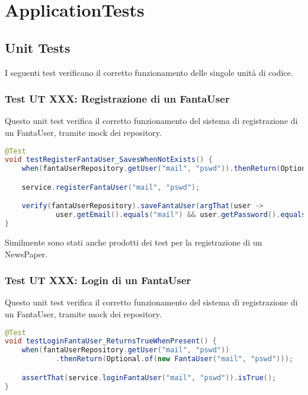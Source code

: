 \section{ApplicationTests}

\subsection{Unit Tests}

I seguenti test verificano il corretto funzionamento delle singole unità di codice.

\subsubsection{Test UT XXX: Registrazione di un FantaUser}

Questo unit test verifica il corretto funzionamento del sistema di registrazione di un FantaUser, 
tramite mock dei repository.

\begin{lstlisting}[language=Java]
@Test
void testRegisterFantaUser_SavesWhenNotExists() {
    when(fantaUserRepository.getUser("mail", "pswd")).thenReturn(Optional.empty());

    service.registerFantaUser("mail", "pswd");

    verify(fantaUserRepository).saveFantaUser(argThat(user ->
            user.getEmail().equals("mail") && user.getPassword().equals("pswd")));
}
\end{lstlisting}

Similmente sono stati anche prodotti dei test per la registrazione di un NewsPaper.


\subsubsection{Test UT XXX: Login di un FantaUser}

Questo unit test verifica il corretto funzionamento del sistema di registrazione di un FantaUser, 
tramite mock dei repository.

\begin{lstlisting}[language=Java]
@Test
void testLoginFantaUser_ReturnsTrueWhenPresent() {
    when(fantaUserRepository.getUser("mail", "pswd"))
            .thenReturn(Optional.of(new FantaUser("mail", "pswd")));

    assertThat(service.loginFantaUser("mail", "pswd")).isTrue();
}
\end{lstlisting}

